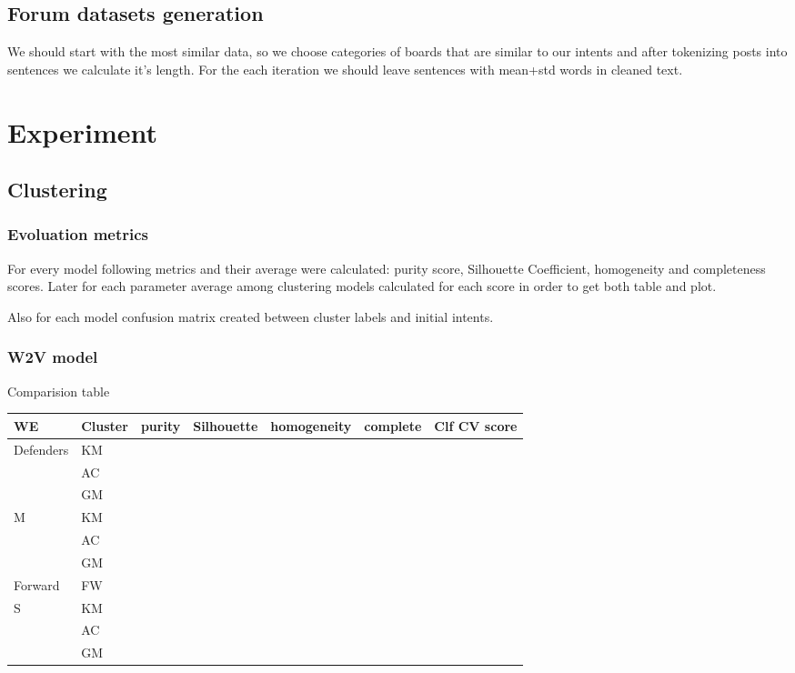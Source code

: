 \documentclass[11pt]{article}
\begin{document}
\subsection{Forum datasets generation}

We should start with the most similar data, so we choose categories of boards that are similar to our intents and after tokenizing  posts into sentences we calculate it's length. For the each iteration we should leave sentences with mean+std words in cleaned text.



\section{Experiment}

\subsection{Clustering}
\subsubsection{Evoluation metrics}

For every model following metrics and their average were calculated: purity score, Silhouette Coefficient, homogeneity and completeness scores. Later for each parameter average among clustering models calculated for each score in order to get both table and plot.

Also for each model confusion matrix created between cluster labels and initial intents.

\subsubsection{W2V model}

Comparision table

\begin{tabular}{ |p{2cm}|p{1cm}|c|c|c|c|p{1cm}| }
\hline
WE & Cluster & purity & Silhouette & homogeneity & complete & Clf CV score \\ \hline
\multirow{3}{*}{Defenders} & KM & & & & &\\
 & AC & & & & &\\
 & GM & & & & &\\ \hline
\multirow{3}{*}{M} & KM & & & & &\\
 & AC & & & & &\\
 & GM & & & & &\\ \hline
Forward & FW & & & & &\\ \hline
\multirow{3}{*}{S} & KM & & & & &\\
 & AC & & & & &\\
 & GM & & & & &\\
\hline
\end{tabular}
\end{document}

